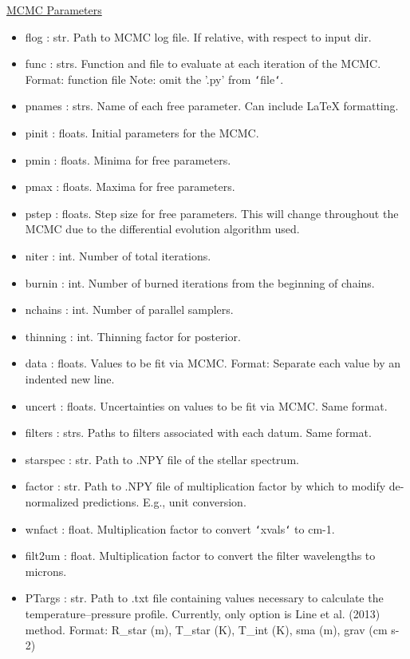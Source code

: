 \documentclass[letterpaper, 12pt]{article}
\begin{document}
\noindent \underline{MCMC Parameters}
\begin{itemize}
\item flog        : str.  Path to MCMC log file. 
                          If relative, with respect to input dir.
\item func        : strs. Function and file to evaluate at each iteration of 
                          the MCMC.
                          Format: function file
                          Note: omit the '.py' from \texttt{`}file\texttt{`}.
\item pnames      : strs. Name of each free parameter. Can include LaTeX 
                          formatting.
\item pinit       : floats. Initial parameters for the MCMC.
\item pmin        : floats. Minima for free parameters.
\item pmax        : floats. Maxima for free parameters.
\item pstep       : floats. Step size for free parameters. 
                          This will change throughout the MCMC due to the 
                          differential evolution algorithm used.
\item niter       : int.  Number of total iterations.
\item burnin      : int.  Number of burned iterations from the beginning of 
                          chains.
\item nchains     : int.  Number of parallel samplers.
\item thinning    : int.  Thinning factor for posterior.
\item data        : floats. Values to be fit via MCMC. 
                          Format: Separate each value by an indented new line.
\item uncert      : floats. Uncertainties on values to be fit via MCMC. 
                          Same format.
\item filters     : strs. Paths to filters associated with each datum. 
                          Same format.
\item starspec    : str.  Path to .NPY file of the stellar spectrum.
\item factor      : str.  Path to .NPY file of multiplication factor by which 
                          to modify de-normalized predictions. 
                          E.g., unit conversion.
\item wnfact      : float. Multiplication factor to convert 
                           \texttt{`}xvals\texttt{`} to cm-1.
\item filt2um     : float. Multiplication factor to convert the filter 
                          wavelengths to microns.
\item PTargs      : str.  Path to .txt file containing values necessary to 
                          calculate the temperature--pressure profile.
                          Currently, only option is Line et al. (2013) method.
                          Format: R\_star (m), T\_star (K), T\_int (K), 
                                  sma    (m), grav (cm s-2)

\end{itemize}
\end{document}
